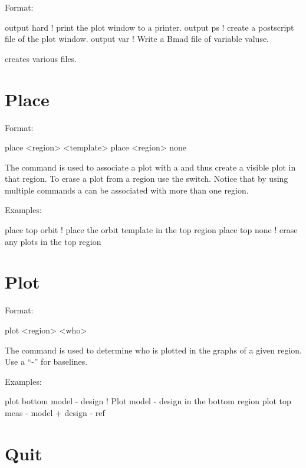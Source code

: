 Format:
\begin{example}
  output hard     ! print the plot window to a printer.
  output ps       ! create a postscript file of the plot window.
  output var      ! Write a Bmad file of variable valuse.
\end{example}

\vskip 0.2in
 creates various files.

\section{Place}
\label{s:place}

Format:
\begin{example}
  place <region> <template>
  place <region> none
\end{example}

\vskip 0.2in 
The  command is used to associate a  plot
with a  and thus create a visible plot in that region. To
erase a plot from a region use the  switch. Notice that by
using multiple  commands a  can be associated
with more than one region.

Examples:
\begin{example}
  place top orbit  ! place the orbit template in the top region
  place top none   ! erase any plots in the top region
\end{example}

\section{Plot}
\label{s:plot}

Format:
\begin{example}
  plot <region> <who>
\end{example}

\vskip 0.2in 
The  command is used to determine who is plotted
in the graphs of a given region. Use a ``-'' for baselines. 

Examples:
\begin{example}
  plot bottom model - design       ! Plot model - design in the bottom region
  plot top meas - model + design - ref 
\end{example}

\section{Quit}
\label{s:quit}

